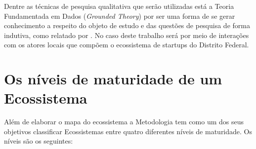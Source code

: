 Dentre as técnicas de pesquisa qualitativa que serão utilizadas está a Teoria Fundamentada em Dados (\textit{Grounded Theory}) por ser uma forma de se gerar conhecimento a respeito do objeto de estudo e das questões de pesquisa de forma indutiva, como relatado por . No caso deste trabalho será por meio de interações com os atores locais que compõem o ecossistema de startups do Distrito Federal.

\section{Os níveis de maturidade de um Ecossistema}
\label{subsection:niveis_de_maturidade_de_um_ecossistema}

Além de elaborar o mapa do ecossistema a Metodologia tem como um dos seus objetivos classificar Ecossistemas entre quatro diferentes níveis de maturidade. Os níveis são os seguintes:

